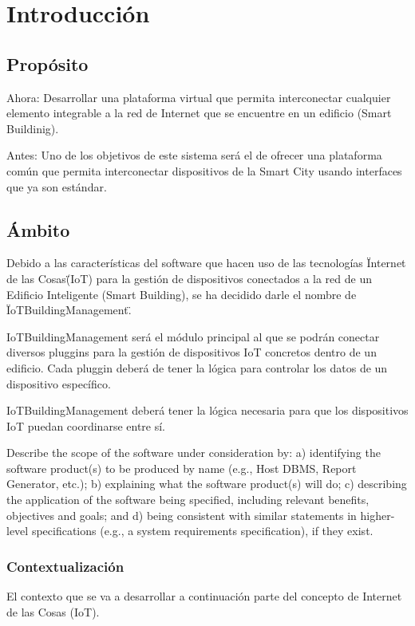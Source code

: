 \documentclass[12pt, a4paper, twoside]{article}
\begin{document}

\newpage
\tableofcontents

\section{Introducción}
\subsection{Propósito}
Ahora:
Desarrollar una plataforma virtual que permita interconectar cualquier elemento 
integrable a la red de Internet que se encuentre en un edificio (Smart Buildinig).


Antes:
Uno de los objetivos de este sistema será el de ofrecer una plataforma común que
permita interconectar dispositivos de la Smart City usando interfaces que ya son estándar.

\subsection{Ámbito}
Debido a las características del software que hacen uso de las tecnologías 
\"Internet de las Cosas\" (IoT) para la gestión de dispositivos conectados a
la red de un Edificio Inteligente (Smart Building), se ha decidido darle el nombre de
\"IoTBuildingManagement\".

IoTBuildingManagement será el módulo principal al que se podrán conectar diversos pluggins para la
gestión de dispositivos IoT concretos dentro de un edificio. Cada pluggin deberá de tener 
la lógica para controlar los datos de un dispositivo específico.

IoTBuildingManagement deberá tener la lógica necesaria para que los dispositivos IoT
puedan coordinarse entre sí.

 Describe the scope of the software under consideration by:
 a) identifying the software product(s) to be produced by name (e.g., Host DBMS, Report Generator, etc.);
 b) explaining what the software product(s) will do;
 c) describing the application of the software being specified, including relevant benefits, objectives
 and goals; and
 d) being consistent with similar statements in higher-level specifications (e.g., a system requirements
 specification), if they exist.

 \subsubsection{Contextualización}
El contexto que se va a desarrollar a continuación parte del concepto de Internet de las Cosas (IoT).
\end{document}

